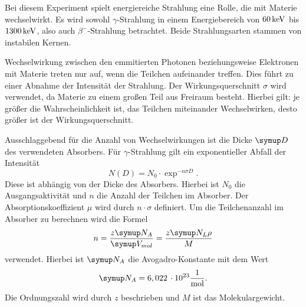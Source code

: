 Bei diesem Experiment spielt energiereiche Strahlung eine Rolle, die mit Materie
wechselwirkt. Es wird sowohl $\gamma$-Strahlung in einem Energiebereich von
$60\,\si{\kilo\electronvolt}$ bis $1300\,\si{\kilo\electronvolt}$, also auch $\beta^{-}$-Strahlung betrachtet. Beide
Strahlungsarten stammen von instabilen Kernen.

Wechselwirkung zwischen den emmitierten Photonen beziehungsweise Elektronen mit
Materie treten nur auf, wenn die Teilchen aufeinander treffen. Dies führt zu einer
Abnahme der Intensität der Strahlung.
Der Wirkungsquerschnitt $\sigma$ wird verwendet, da Materie zu einem großen Teil
aus Freiraum besteht. Hierbei gilt: je größer die Wahrscheinlichkeit ist, das
Teilchen miteinander Wechselwirken, desto größer ist der Wirkungsquerschnitt.

Ausschlaggebend für die Anzahl von Wechselwirkungen ist die Dicke $\su{D}$ des
verwendeten Absorbers. Für $\gamma$-Strahlung gilt ein exponentieller Abfall der
Intensität
\begin{equation}
  N(D) = N_0 \cdot \exp^{-n\sigma D}.
  \label{eqn:steig}
\end{equation}
Diese ist abhängig von der Dicke des Absorbers.
Hierbei ist $N_0$ die Ausgangsaktivität und $n$ die Anzahl der Teilchen im Absorber.
Der Absorptionskoeffizient $\mu$ wird durch $n\cdot\sigma$ definiert. Um die
Teilchenanzahl im Absorber zu berechnen wird die Formel
\begin{equation}
  n = \frac{z\su{N_A}}{\su{V_{mol}}} = \frac{z\su{N_L}\rho}{M}
\end{equation}
verwendet. Hierbei ist $\su{N_A}$ die Avogadro-Konstante\cite{avo} mit dem Wert
\begin{equation*}
  \su{N_A} = 6,022\,\cdot10^{23}\frac{1}{\si{\mol}}.
\end{equation*}
Die Ordnungszahl wird durch $z$ beschrieben
und $M$ ist das Molekulargewicht.

